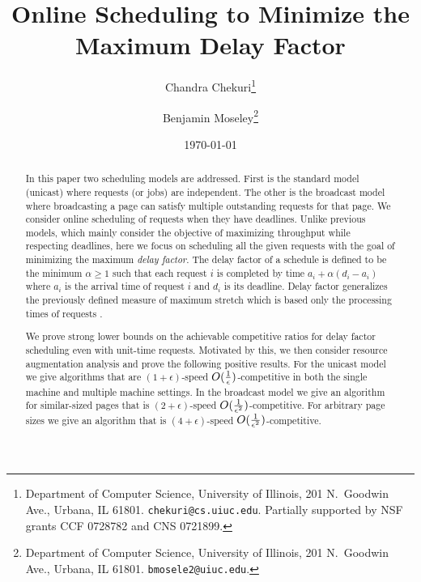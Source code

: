 \documentclass[11pt]{article}
\newcommand{\eps}{\epsilon}
\begin{document}
\title{Online Scheduling to Minimize the Maximum Delay Factor}
\author{
Chandra Chekuri\thanks{Department of Computer Science,
University of Illinois, 201 N.\ Goodwin Ave.,
Urbana, IL 61801. {\tt chekuri@cs.uiuc.edu}.
Partially supported by NSF grants CCF 0728782
 and CNS 0721899. }
\and
Benjamin Moseley\thanks{Department of Computer Science,
University of Illinois, 201 N.\ Goodwin Ave.,
Urbana, IL 61801. {\tt bmosele2@uiuc.edu}.
}
}
\date{\today}
\maketitle


\begin{abstract}
  In this paper two scheduling models are addressed. First is the
  standard model (unicast) where requests (or jobs) are
  independent. The other is the broadcast model where broadcasting a
  page can satisfy multiple outstanding requests for that page. We
  consider online scheduling of requests when they have deadlines.
  Unlike previous models, which mainly consider the objective of
  maximizing throughput while respecting deadlines, here we focus on
  scheduling all the given requests with the goal of minimizing the
  maximum {\em delay factor}. The delay factor of a schedule is
  defined to be the minimum $\alpha \ge 1$ such that each request $i$
  is completed by time $a_i + \alpha(d_i - a_i)$ where $a_i$ is the
  arrival time of request $i$ and $d_i$ is its deadline. Delay factor
  generalizes the previously defined measure of maximum stretch which
  is based only the processing times of requests
  \cite{BenderCM98,BenderMR02}.

  We prove strong lower bounds on the achievable competitive ratios
  for delay factor scheduling even with unit-time requests. Motivated
  by this, we then consider resource augmentation analysis
  \cite{KalyanasundaramP95} and prove the following positive results.
  For the unicast model we give algorithms that are $(1 + \eps)$-speed
  $O({1 \over \eps})$-competitive in both the single machine and
  multiple machine settings. In the broadcast model we give an
  algorithm for similar-sized pages that is $(2+ \eps)$-speed $O({1
    \over \eps^2})$-competitive. For arbitrary page sizes we give an
  algorithm that is $(4+\eps)$-speed $O({1 \over
    \eps^2})$-competitive.
\end{abstract}

\setcounter{page}{0}
\thispagestyle{empty}
\clearpage
\end{document}
